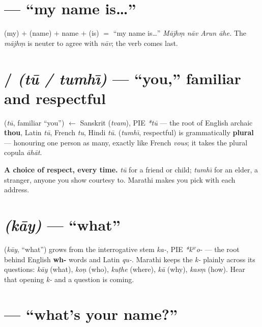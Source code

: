 \section{ --- ``my name is\ldots''}
\label{lesson:majhe-naav-aahe}

 (my) $+$  (name) $+$ name $+$  (is) $=$ ``my name
is\ldots'' \emph{M\=ajh\d{m} n\=av Arun \=ahe.} The \emph{m\=ajh\d{m}} is neuter
to agree with \emph{n\=av}; the verb comes last.

\section{ /  \emph{(t\=u / tumh\=\i)} --- ``you,'' familiar and respectful}
\label{lesson:tu-tumhi}

\begin{cousinweb}
 (\emph{t\=u}, familiar ``you'') $\leftarrow$ Sanskrit 
(\emph{tvam}), PIE \emph{*t\=u} --- the root of English archaic \textbf{thou},
Latin \emph{t\=u}, French \emph{tu}, Hindi \emph{t\=u}. 
(\emph{tumh\=\i}, respectful) is grammatically \textbf{plural} --- honouring one
person as many, exactly like French \emph{vous}; it takes the plural copula
\emph{\=ah\=at}.
\end{cousinweb}

\begin{grammarlens}
\textbf{A choice of respect, every time.} \emph{t\=u} for a friend or child;
\emph{tumh\=\i} for an elder, a stranger, anyone you show courtesy to. Marathi
makes you pick with each address.
\end{grammarlens}

\section{ \emph{(k\=ay)} --- ``what''}
\label{lesson:kaay}

\begin{cousinweb}
 (\emph{k\=ay}, ``what'') grows from the interrogative stem \emph{ka-},
PIE \emph{*k\ensuremath{^w}o-} --- the root behind English \textbf{wh-} words and
Latin \emph{qu-}. Marathi keeps the \emph{k-} plainly across its questions:
\emph{k\=ay} (what), \emph{ko\d{n}} (who), \emph{ku\d{t}he} (where), \emph{k\=a}
(why), \emph{kas\d{m}} (how). Hear that opening \emph{k-} and a question is
coming.
\end{cousinweb}

\section{ --- ``what's your name?''}
\label{lesson:tumche-naav-kaay-aahe}

